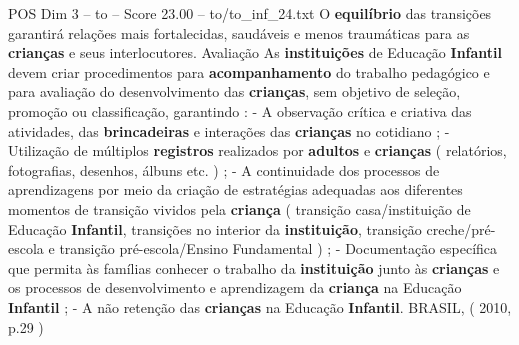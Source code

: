\begin{textsample}{POS Dim 3 – to – Score 23.00 – to/to\_inf\_24.txt}
O \textbf{equilíbrio} das transições garantirá relações mais fortalecidas, saudáveis e menos traumáticas para as \textbf{crianças} e seus interlocutores.
Avaliação As \textbf{instituições} de Educação \textbf{Infantil} devem criar procedimentos para \textbf{acompanhamento} do trabalho pedagógico e para avaliação do desenvolvimento das \textbf{crianças}, sem objetivo de seleção, promoção ou classificação, garantindo : - A observação crítica e criativa das atividades, das \textbf{brincadeiras} e interações das \textbf{crianças} no cotidiano ; - Utilização de múltiplos \textbf{registros} realizados por \textbf{adultos} e \textbf{crianças} ( relatórios, fotografias, desenhos, álbuns etc. ) ; - A continuidade dos processos de aprendizagens por meio da criação de estratégias adequadas aos diferentes momentos de transição vividos pela \textbf{criança} ( transição casa/instituição de Educação \textbf{Infantil}, transições no interior da \textbf{instituição}, transição creche/pré-escola e transição pré-escola/Ensino Fundamental ) ; - Documentação específica que permita às famílias conhecer o trabalho da \textbf{instituição} junto às \textbf{crianças} e os processos de desenvolvimento e aprendizagem da \textbf{criança} na Educação \textbf{Infantil} ; - A não retenção das \textbf{crianças} na Educação \textbf{Infantil}.
BRASIL, ( 2010, p.29 )

\end{textsample}
